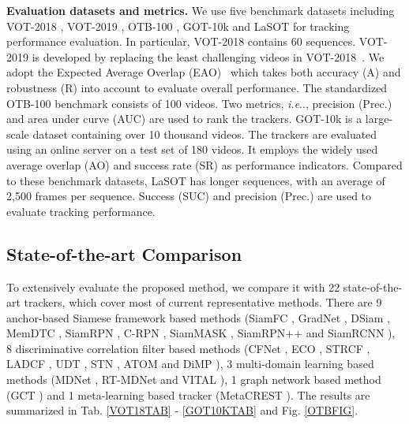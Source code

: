 \documentclass[runningheads]{llncs}
\makeatletter
\DeclareRobustCommand\onedot{\futurelet\@let@token\@onedot}
\def\@onedot{\ifx\@let@token.\else.\null\fi\xspace}
\def\ie{\emph{i.e}\onedot} \def\Ie{\emph{I.e}\onedot}
\makeatother
\begin{document}
\textbf{Evaluation datasets and metrics.}\label{Sec5.1}
We use five benchmark datasets including VOT-2018 \cite{VOT-2018}, VOT-2019 \cite{VOT2019}, OTB-100 \cite{OTB-2015}, GOT-10k \cite{GOT10K} and LaSOT \cite{LASOT} for tracking performance evaluation. In particular, VOT-2018 \cite{VOT-2018} contains 60 sequences. VOT-2019 \cite{VOT2019} is developed by replacing the  least challenging videos in VOT-2018~\cite{VOT-2018}. We adopt the Expected Average Overlap (EAO)~\cite{VOT2019} which takes both accuracy (A) and robustness (R) into account to evaluate overall performance. The standardized OTB-100 \cite{OTB-2015} benchmark consists of 100 videos. Two metrics, \ie, precision (Prec.) and area under curve (AUC) are used to rank the trackers. GOT-10k \cite{GOT10K} is a large-scale dataset containing over 10 thousand videos. The trackers are evaluated using an online server on a test set of 180 videos. It employs the widely used average overlap (AO) and success rate (SR) as performance indicators. Compared to these benchmark datasets, LaSOT \cite{LASOT} has longer sequences, with an average of 2,500 frames per sequence. Success (SUC) and precision (Prec.) are used to evaluate tracking performance.







\vspace{-1em}
\subsection{State-of-the-art Comparison}
To extensively evaluate the proposed method, we compare it with 22 state-of-the-art trackers, which cover most of current representative methods. There are 9 anchor-based Siamese framework based methods (SiamFC \cite{siamFC}, GradNet \cite{GradNet}, DSiam \cite{DSiam}, MemDTC \cite{MemDTC}, SiamRPN \cite{siamRPN}, C-RPN \cite{CRPN}, SiamMASK \cite{SiamMASK}, SiamRPN++ \cite{SiamRPN++} and SiamRCNN \cite{SiamRCNN}), 8 discriminative correlation filter based methods (CFNet \cite{CFNet}, ECO \cite{ECO}, STRCF \cite{STRCF}, LADCF \cite{LADCF}, UDT \cite{UDT}, STN \cite{STN}, ATOM \cite{ATOM} and DiMP \cite{DiMP}), 
3 multi-domain learning based methods (MDNet \cite{MDNet}, RT-MDNet \cite{RT-MDNet} and VITAL \cite{VITAL}), 1 graph network based method (GCT \cite{GCT}) and 1 meta-learning based tracker (MetaCREST \cite{METATRACKER}). 
The results are summarized in Tab. \ref{VOT18TAB} - \ref{GOT10KTAB} and Fig. \ref{OTBFIG}. 
\end{document}
